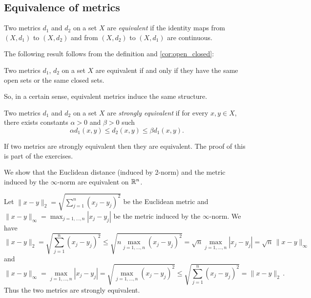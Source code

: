\documentclass{article}
\begin{document}
\subsection{Equivalence of metrics}

\begin{definition}
Two metrics $d_1$ and $d_2$ on a set $X$ are \emph{equivalent} if the identity maps from $(X,d_1)$ to $(X,d_2)$ and from $(X,d_2)$ to $(X,d_1)$ are continuous. 
\end{definition}

The following result follows from the definition and \cref{cor:open_closed}:

\begin{proposition}
Two metrics $d_1$, $d_2$ on a set $X$ are equivalent if and only if they have the same open sets or the same closed sets.
\end{proposition}

So, in a certain sense, equivalent metrics induce the same structure.

\begin{definition}
Two metrics $d_1$ and $d_2$ on a set $X$ are \emph{strongly equivalent} if for every $x,y\in X$, there exists constants $\alpha>0$ and $\beta>0$ such
\begin{equation*}
    \alpha d_1(x,y) \leq d_2(x,y) \leq \beta d_1(x,y).
\end{equation*}
\end{definition}

If two metrics are strongly equivalent then they are equivalent. The proof of this is part of the exercises. 

\begin{example}
We show that the Euclidean distance (induced by 2-norm) and the metric induced by the $\infty$-norm are equivalent on ${\mathbb{R}}^n$. 

\vspace{1em}
Let $\|x-y\|_2=\sqrt{\sum_{j=1}^n (x_j - y_j)^2}$ be the Euclidean metric and $\|x-y\|_\infty= \max_{j=1,\ldots,n} |x_j - y_j|$ be the metric induced by the $\infty$-norm. We have
\begin{equation*}
   \|x-y\|_2 = \sqrt{\sum_{j=1}^n (x_j - y_j)^2} \leq  \sqrt{ n \max_{j=1,\ldots,n} (x_j - y_j)^2}  = \sqrt{n} \max_{j=1,\ldots,n} |x_j - y_j| = \sqrt{n} \, \|x-y\|_\infty
\end{equation*}
and
\begin{equation*}
    \|x-y\|_\infty = \max_{j=1,\ldots,n} |x_j - y_j|  = \sqrt{\max_{j=1,\ldots,n} (x_j - y_j)^2} \leq \sqrt{\sum_{j=1}^n(x_j - y_j)^2}  = \|x-y\|_2  \, .
\end{equation*}
Thus the two metrics are strongly equivalent. 
\end{example}
\end{document}

